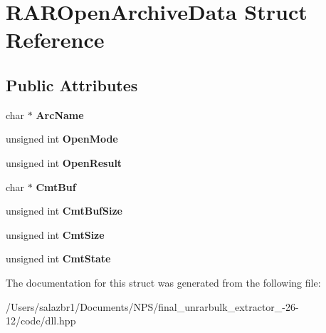 \hypertarget{struct_r_a_r_open_archive_data}{\section{R\-A\-R\-Open\-Archive\-Data Struct Reference}
\label{struct_r_a_r_open_archive_data}
}
\subsection*{Public Attributes}
\begin{DoxyCompactItemize}
\item 
\hypertarget{struct_r_a_r_open_archive_data_a74fb8d7da961fdf592a61e6166789294}{char $\ast$ {\bfseries Arc\-Name}}\label{struct_r_a_r_open_archive_data_a74fb8d7da961fdf592a61e6166789294}

\item 
\hypertarget{struct_r_a_r_open_archive_data_abfc5f263898e8e960812e884d5dc53ab}{unsigned int {\bfseries Open\-Mode}}\label{struct_r_a_r_open_archive_data_abfc5f263898e8e960812e884d5dc53ab}

\item 
\hypertarget{struct_r_a_r_open_archive_data_a8582c3c0d4bf2a0b2baf9988747ba003}{unsigned int {\bfseries Open\-Result}}\label{struct_r_a_r_open_archive_data_a8582c3c0d4bf2a0b2baf9988747ba003}

\item 
\hypertarget{struct_r_a_r_open_archive_data_ae0b098acd999704640ec1cd0c0885037}{char $\ast$ {\bfseries Cmt\-Buf}}\label{struct_r_a_r_open_archive_data_ae0b098acd999704640ec1cd0c0885037}

\item 
\hypertarget{struct_r_a_r_open_archive_data_a02e00488347d06d1a495fc31bb03f2a1}{unsigned int {\bfseries Cmt\-Buf\-Size}}\label{struct_r_a_r_open_archive_data_a02e00488347d06d1a495fc31bb03f2a1}

\item 
\hypertarget{struct_r_a_r_open_archive_data_a09b25eb715d61ab6befb5e81839ba31a}{unsigned int {\bfseries Cmt\-Size}}\label{struct_r_a_r_open_archive_data_a09b25eb715d61ab6befb5e81839ba31a}

\item 
\hypertarget{struct_r_a_r_open_archive_data_a88c016de11b0d5748836559db485c401}{unsigned int {\bfseries Cmt\-State}}\label{struct_r_a_r_open_archive_data_a88c016de11b0d5748836559db485c401}

\end{DoxyCompactItemize}


The documentation for this struct was generated from the following file\-:\begin{DoxyCompactItemize}
\item 
/\-Users/salazbr1/\-Documents/\-N\-P\-S/final\-\_\-unrarbulk\-\_\-extractor\-\_-\/26-\/12/code/dll.\-hpp\end{DoxyCompactItemize}
